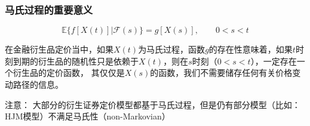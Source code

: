 \documentclass[t]{beamer}
\newcommand{\E}{\mathbb{E}}
\begin{document}
\begin{frame}
	\frametitle{马氏过程的重要意义}
	\begin{equation*}
		\E\Big\{f[X(t)]\Big| \mathcal{F}(s)\Big\}=g[X(s)],\qquad 0<s<t 
	\end{equation*}

	在金融衍生品定价当中，如果$X(t)$为马氏过程，函数$g$的存在性意味着，如果$t$时刻到期的衍生品的随机性只是依赖于$X(t)$，则在$s$时刻（$0< s < t$），一定存在一个衍生品的定价函数，
其仅仅是$X(s)$的函数，我们不需要储存任何有关价格变动路径的信息。


\begin{block}{注意：}
	大部分的衍生证券定价模型都基于马氏过程，但是仍有部分模型（比如：HJM模型）不满足马氏性（non-Markovian）
\end{block}
\end{frame}
\end{document}
